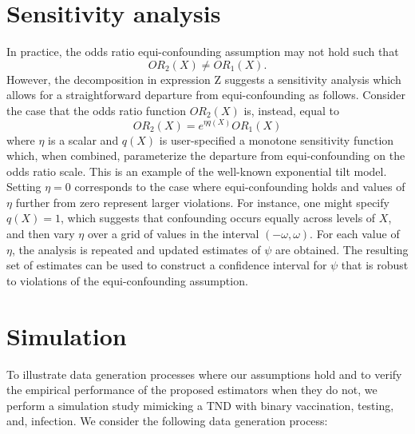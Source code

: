 \documentclass[11pt]{article}
\begin{document}
\section{Sensitivity analysis}
In practice, the odds ratio equi-confounding assumption may not hold such that
$$OR_2(X) \neq OR_1(X).$$ 
However, the decomposition in expression Z suggests a sensitivity analysis which allows for a straightforward departure from equi-confounding as follows. Consider the case that the odds ratio function $OR_2(X)$ is, instead, equal to
$$ OR_2(X) = e^{\eta q(X)} OR_1(X) $$
where $\eta$ is a scalar and $q(X)$ is user-specified a monotone sensitivity function which, when combined, parameterize the departure from equi-confounding on the odds ratio scale. This is an example of the well-known exponential tilt model. Setting $\eta = 0$ corresponds to the case where equi-confounding holds and values of $\eta$ further from zero represent larger violations. For instance, one might specify $q(X) = 1$, which suggests that confounding occurs equally across levels of $X$, and then vary $\eta$ over a grid of values in the interval $(-\omega, \omega)$. For each value of $\eta$, the analysis is repeated and updated estimates of $\psi$ are obtained. The resulting set of estimates can be used to construct a confidence interval for $\psi$ that is robust to violations of the equi-confounding assumption.

\section{Simulation}

To illustrate data generation processes where our assumptions hold and to verify the empirical performance of the proposed estimators when they do not, we perform a simulation study mimicking a TND with binary vaccination, testing, and, infection. We consider the following data generation process:
\end{document}
